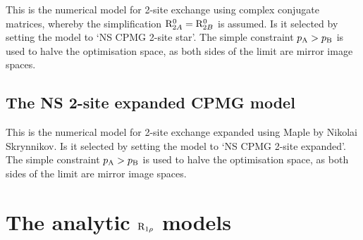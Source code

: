 This is the numerical model for 2-site exchange using complex conjugate matrices, whereby the simplification $\mathrm{R}_{2A}^0 = \mathrm{R}_{2B}^0$ is assumed.
Is it selected by setting the model to `NS CPMG 2-site star'.
The simple constraint $p_\textrm{A} > p_\textrm{B}$ is used to halve the optimisation space, as both sides of the limit are mirror image spaces.



\subsection{The NS 2-site expanded CPMG model}
\label{sect: dispersion: NS CPMG 2-site expanded model}

This is the numerical model for 2-site exchange expanded using Maple by Nikolai Skrynnikov.
Is it selected by setting the model to `NS CPMG 2-site expanded'.
The simple constraint $p_\textrm{A} > p_\textrm{B}$ is used to halve the optimisation space, as both sides of the limit are mirror image spaces.




\section{The analytic $\mathrm{R}_{1\rho}$ models}
\label{sect: dispersion: analytical R1rho models}

